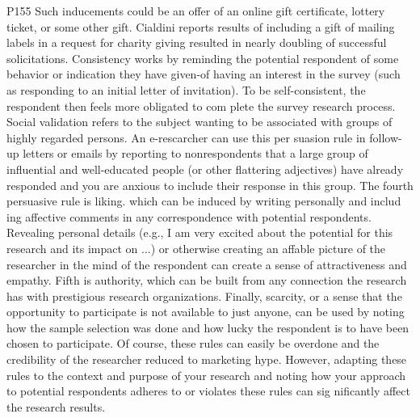 \documentclass{beamer}
\begin{document}
\begin{frame}{P155}
Such inducements could be an offer of an online gift certificate, lottery ticket, or some other gift. 
Cialdini reports results of including a gift of mailing labels in a request for charity giving resulted in nearly doubling of successful solicitations. Consistency works by reminding the potential respondent of some behavior or indication they have given-of 
having an interest in the survey (such as responding to an initial letter of invitation). To be self-consistent, 
the respondent then feels more obligated to com plete the survey research process. Social validation refers to the subject wanting
to be associated with groups of highly regarded persons. An e-rescarcher can use this per suasion rule in follow-up letters or emails 
by reporting to nonrespondents that a large group of influential and well-educated people (or other flattering adjectives) have already 
responded and you are anxious to include their response in this group. The fourth persuasive rule is liking. which can be induced by writing 
personally and includ ing affective comments in any correspondence with potential respondents. Revealing personal details 
(e.g., I am very excited about the potential for this research and its impact on ...) or otherwise creating an affable picture of the researcher 
in the mind of the respondent can create a sense of attractiveness and empathy. Fifth is authority, which can be built from any connection the research
has with prestigious research organizations. Finally, scarcity, or a sense that the opportunity to participate is not available to just anyone, 
can be used by noting how the sample selection was done and how lucky the respondent is to have been chosen to participate. Of course, 
these rules can easily be overdone and the credibility of the researcher reduced to marketing hype. However, adapting these rules to the context 
and purpose of your research and noting how your approach to potential respondents adheres to or violates these rules can sig nificantly 
affect the research results. 

\end{frame}
\end{document}
